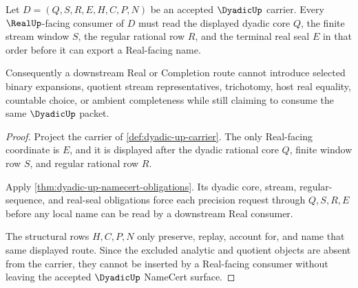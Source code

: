 \begin{theorem}
\label{thm:dyadic-up-real-seal-factorization}
Let $D=(Q,S,R,E,H,C,P,N)$ be an accepted $\DyadicUp$ carrier. Every $\RealUp$-facing consumer of $D$ must read the displayed dyadic core $Q$, the finite stream window $S$, the regular rational row $R$, and the terminal real seal $E$ in that order before it can export a Real-facing name.

Consequently a downstream Real or Completion route cannot introduce selected binary expansions, quotient stream representatives, trichotomy, host real equality, countable choice, or ambient completeness while still claiming to consume the same $\DyadicUp$ packet.
\end{theorem}
\begin{proof}
Project the carrier of \autoref{def:dyadic-up-carrier}. The only Real-facing coordinate is $E$, and it is displayed after the dyadic rational core $Q$, finite window row $S$, and regular rational row $R$.

Apply \autoref{thm:dyadic-up-namecert-obligations}. Its dyadic core, stream, regular-sequence, and real-seal obligations force each precision request through $Q,S,R,E$ before any local name can be read by a downstream Real consumer.

The structural rows $H,C,P,N$ only preserve, replay, account for, and name that same displayed route. Since the excluded analytic and quotient objects are absent from the carrier, they cannot be inserted by a Real-facing consumer without leaving the accepted $\DyadicUp$ NameCert surface.
\end{proof}

